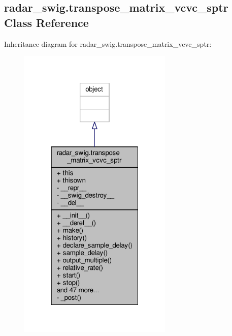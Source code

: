 \subsection{radar\+\_\+swig.\+transpose\+\_\+matrix\+\_\+vcvc\+\_\+sptr Class Reference}
\label{classradar__swig_1_1transpose__matrix__vcvc__sptr}


Inheritance diagram for radar\+\_\+swig.\+transpose\+\_\+matrix\+\_\+vcvc\+\_\+sptr\+:
\nopagebreak
\begin{figure}[H]
\begin{center}
\leavevmode
\includegraphics[width=208pt]{dd/d0c/classradar__swig_1_1transpose__matrix__vcvc__sptr__inherit__graph}
\end{center}
\end{figure}



